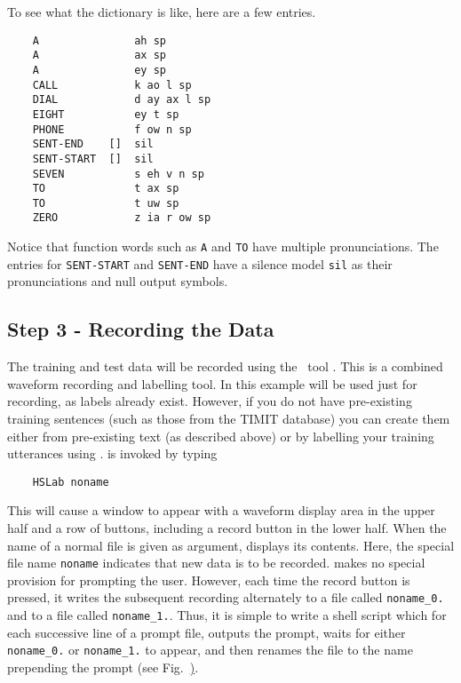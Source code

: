 To see what the dictionary is like, here are a few entries.
\begin{verbatim}
    A               ah sp
    A               ax sp
    A               ey sp
    CALL            k ao l sp
    DIAL            d ay ax l sp
    EIGHT           ey t sp
    PHONE           f ow n sp
    SENT-END    []  sil
    SENT-START  []  sil
    SEVEN           s eh v n sp
    TO              t ax sp
    TO              t uw sp
    ZERO            z ia r ow sp
\end{verbatim}
Notice that function words such as \texttt{A} and \texttt{TO}
have multiple pronunciations.
The entries for \texttt{SENT-START} and \texttt{SENT-END} have a silence
model \texttt{sil} as their pronunciations and null output symbols.  

\subsection{Step 3 - Recording the Data}

The training and test data will be recorded using the
\HTK\ tool . This is a combined 
waveform recording and labelling tool. In this example  will be
used just for recording, as labels already exist. However, if you do not have
pre-existing training sentences (such as those from the TIMIT database) you can
create them either from pre-existing text (as described above) or by labelling
your training utterances using .  is invoked by typing
\begin{verbatim}
    HSLab noname
\end{verbatim}
This will cause a window to appear with a waveform display area in the upper
half and a row of buttons, including a record button in the lower half.  When
the name of a normal file is given as argument,  displays its
contents.  Here, the special file name \texttt{noname} indicates that new data
is to be recorded.  makes no special provision for prompting the
user.  However, each time the record button is pressed, it writes the
subsequent recording alternately to a file called \verb|noname_0.| and to a
file called \verb|noname_1.|.  Thus, it is simple to write a shell script
which for each successive line of a prompt file, outputs the prompt, waits for
either \verb|noname_0.| or \verb|noname_1.| to appear, and then renames
the file to the name prepending the prompt (see Fig.~\href{f:step3}).


